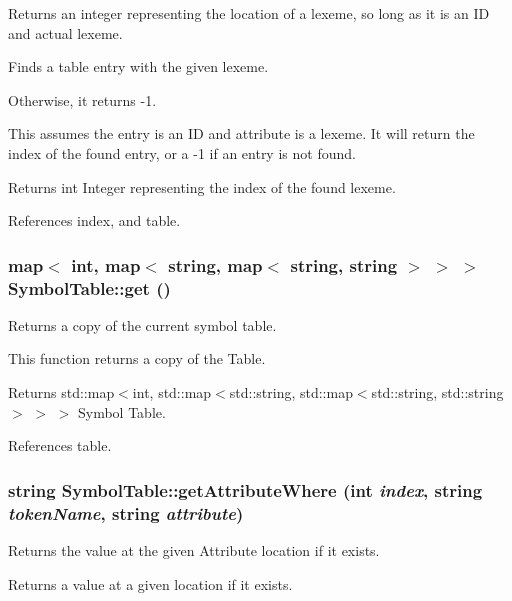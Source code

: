 Returns an integer representing the location of a lexeme, so long as it is an ID and actual lexeme. 

Finds a table entry with the given lexeme.

Otherwise, it returns -\/1.

This assumes the entry is an ID and attribute is a lexeme. It will return the index of the found entry, or a -\/1 if an entry is not found. \begin{DoxyReturn}{Returns}
int Integer representing the index of the found lexeme. 
\end{DoxyReturn}


References index, and table.

\hypertarget{classSymbolTable_ad9429553f1aadeade3339e32e4f4c61e}{
\subsubsection[{get}]{\setlength{\rightskip}{0pt plus 5cm}map$<$ int, map$<$ string, map$<$ string, string $>$ $>$ $>$ SymbolTable::get ()}}
\label{classSymbolTable_ad9429553f1aadeade3339e32e4f4c61e}


Returns a copy of the current symbol table. 

This function returns a copy of the Table.

\begin{DoxyReturn}{Returns}
std::map$<$int, std::map$<$std::string, std::map$<$std::string, std::string$>$ $>$ $>$ Symbol Table. 
\end{DoxyReturn}


References table.

\hypertarget{classSymbolTable_aa5e55d23f3b69e48a8e6c385bd9d509f}{
\subsubsection[{getAttributeWhere}]{\setlength{\rightskip}{0pt plus 5cm}string SymbolTable::getAttributeWhere (int {\em index}, \/  string {\em tokenName}, \/  string {\em attribute})}}
\label{classSymbolTable_aa5e55d23f3b69e48a8e6c385bd9d509f}


Returns the value at the given Attribute location if it exists. 

Returns a value at a given location if it exists.

